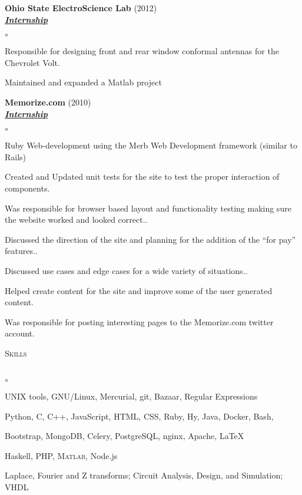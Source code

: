 \documentclass{article}
\newcommand{\lineunder}{\vspace*{-8pt} \\ \hspace*{-18pt} \hrulefill \\}
\newcommand{\header}[1]{{\hspace*{-15pt}\vspace*{6pt} \textsc{#1}} \vspace*{-6pt} \lineunder}
\newcommand{\employer}[3]{{ \textbf{#1} (#2)\\ \underline{\textbf{\emph{#3}}}\\  }}
\newenvironment{achievements}{\begin{list}{$\circ$}{\topsep 0pt \itemsep -2pt}}{\vspace*{4pt}\end{list}}
\begin{document}
\employer{Ohio State ElectroScience Lab}{2012}{Internship}
	\begin{achievements}
	\item Responsible for designing front and rear window conformal antennas for the Chevrolet Volt.
	\item Maintained and expanded a Matlab project
	\end{achievements}

\employer{Memorize.com}{2010}{Internship}
	\begin{achievements}
	\item Ruby Web-development using the Merb Web Development framework
(similar to Rails)
	\item Created and Updated unit tests for the site to test the proper
interaction of components.
	\item Was responsible for browser based layout and functionality testing
making sure the website worked and looked correct..
	\item Discussed the direction of the site and planning
for the addition of the ``for pay'' features..
	\item Discussed use cases and edge cases for a wide variety of
situations..
	\item Helped create content for the site and improve some of the
	user generated content.
	\item Was responsible for posting interesting pages to the Memorize.com twitter
  account.
	\end{achievements}

\header{Skills}
\begin{achievements}
	\item UNIX tools, GNU/Linux, Mercurial, git, Bazaar, Regular Expressions
	\item Python, C, C++, JavaScript, HTML, CSS, Ruby, Hy, Java, Docker, Bash,
	\item Bootstrap, MongoDB, Celery, PostgreSQL, nginx, Apache, \LaTeX
	\item Haskell, PHP, \textsc{Matlab}, Node.js
	\item Laplace, Fourier and Z transforms; Circuit Analysis, Design, and Simulation; VHDL
\end{achievements}
\end{document}
